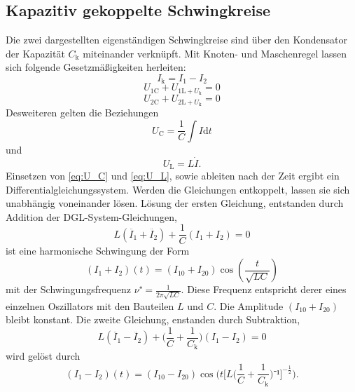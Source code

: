 \subsection{Kapazitiv gekoppelte Schwingkreise}
Die zwei dargestellten eigenständigen Schwingkreise sind über den Kondensator der Kapazität $C_\mathup{k}$ miteinander verknüpft.
 Mit Knoten- und Maschenregel lassen sich folgende Gesetzmäßigkeiten herleiten:
\begin{equation}
	I_\mathup{k}=I_1-I_2
	\label{eq:I_k}
\end{equation}
\begin{equation}
	U_{1\mathup{C}}+U_{1\mathup{L}+U_{\mathup{k}}}=0
	\label{eq:U_1}
\end{equation}
\begin{equation}
	U_{2\mathup{C}}+U_{2\mathup{L}+U_{\mathup{k}}}=0
	\label{eq:U_2}
\end{equation}
Desweiteren gelten die Beziehungen
\begin{equation}
	U_\mathup{C}=\frac{1}{C}\int{I\mathup{d}t}
	\label{eq:U_C}
\end{equation}
und
\begin{equation}
	U_\mathup{L}=L\dot{I}.
	\label{eq:U_L}
\end{equation}
Einsetzen von \eqref{eq:U_C} und \eqref{eq:U_L}, sowie ableiten nach der Zeit ergibt ein Differentialgleichungssystem. 
Werden die Gleichungen entkoppelt, lassen sie sich unabhängig voneinander lösen.
Lösung der ersten Gleichung, entstanden durch Addition der DGL-System-Gleichungen,
\begin{equation}
	L(\ddot{I_1}+\ddot{I_2})+\frac{1}{C}({I_1}+{I_2})=0
	\label{eq:I_1+I_2}
\end{equation}
ist eine harmonische Schwingung der Form
\begin{equation}
	({I_1}+{I_2})(t)=({I_{10}}+{I_{20}})\cos(\frac{t}{\sqrt{LC}})
\end{equation}
mit der Schwingungsfrequenz $\nu⁺=\frac{1}{2\pi\sqrt{LC}}$.
Diese Frequenz entspricht derer eines einzelnen Oszillators mit den Bauteilen $L$ und $C$.
 Die Amplitude $({I_10}+{I_20})$ bleibt konstant.
Die zweite Gleichung, enstanden durch Subtraktion,
\begin{equation}
	L(\ddot{I_1}-\ddot{I_2})+\bigl(\frac{1}{C}+\frac{1}{C_\mathup{k}}\bigr)({I_1}-{I_2})=0
	\label{eq:I_1-I_2}
\end{equation}
wird gelöst durch
\begin{equation}
	({I_1}-{I_2})(t)=({I_{10}}-{I_{20}})\cos\biggl(t{\biggl[L\biggl({\frac{1}{C}+\frac{1}{C_\mathup{k}}}\biggr)⁻¹\biggr]^{-\frac{1}{2}}}\biggr).
\end{equation}
